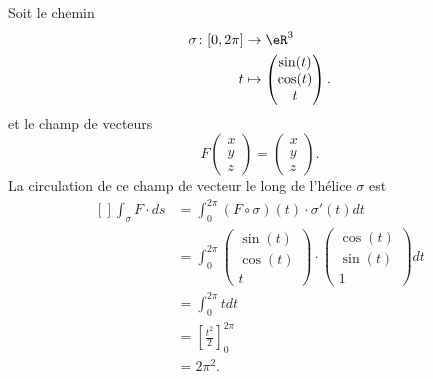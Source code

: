 \begin{example}
    Soit le chemin
    \begin{equation}
        \begin{aligned}
            \sigma\colon \mathopen[ 0 , 2\pi \mathclose]&\to \eR^3 \\
            t&\mapsto \begin{pmatrix}
                \sin(t)    \\ 
                \cos(t)    \\ 
                t    
            \end{pmatrix}.
        \end{aligned}
    \end{equation}
    et le champ de vecteurs
    \begin{equation}
        F\begin{pmatrix}
            x    \\ 
            y    \\ 
            z    
        \end{pmatrix}=\begin{pmatrix}
            x    \\ 
            y    \\ 
            z    
        \end{pmatrix}.
    \end{equation}
    La circulation de ce champ de vecteur le long de l'hélice $\sigma$ est
    \begin{equation}
        \begin{aligned}[]
            \int_{\sigma}F\cdot ds&=\int_0^{2\pi}(F\circ \sigma)(t)\cdot \sigma'(t)dt\\
            &=\int_0^{2\pi}\begin{pmatrix}
                \sin(t)    \\ 
                \cos(t)    \\ 
                t    
            \end{pmatrix}\cdot
            \begin{pmatrix}
                \cos(t)    \\ 
                \sin(t)    \\ 
                1    
            \end{pmatrix}dt\\
            &=\int_0^{2\pi}tdt\\
            &=\left[ \frac{ t^2 }{2} \right]_0^{2\pi}\\
            &=2\pi^2.
        \end{aligned}
    \end{equation}
    
\end{example}

